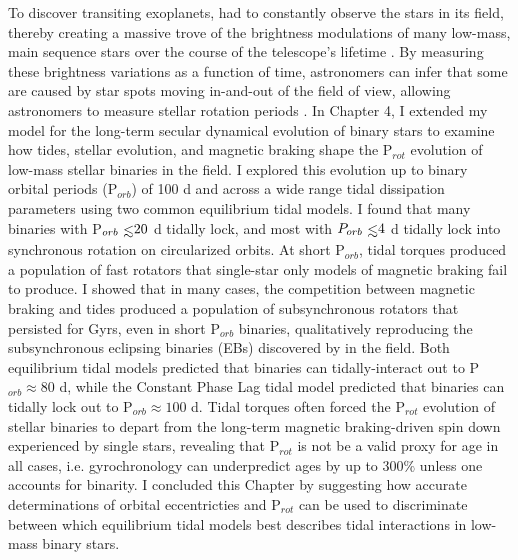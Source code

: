 To discover transiting exoplanets, \kepler had to constantly observe the stars in its field, thereby creating a massive trove of the brightness modulations of many low-mass, main sequence stars over the course of the telescope's lifetime \citep{Borucki2003,Borucki2010}. By measuring these brightness variations as a function of time, astronomers can infer that some are caused by star spots moving in-and-out of the field of view, allowing astronomers to measure stellar rotation periods \citep[P$_{rot}$, see][]{McQuillan2014}. In Chapter 4, I extended my model for the long-term secular dynamical evolution of binary stars to examine how tides, stellar evolution, and magnetic braking shape the P$_{rot}$ evolution of low-mass stellar binaries in the \kepler field. I explored this evolution up to binary orbital periods (P$_{orb}$) of 100 d and across a wide range tidal dissipation parameters using two common equilibrium tidal models. I found that many binaries with P$_{orb} \lsim 20$ d tidally lock, and most with $P_{orb} \lsim 4$ d tidally lock into synchronous rotation on circularized orbits. At short P$_{orb}$, tidal torques produced a population of fast rotators that single-star only models of magnetic braking fail to produce.  I showed that in many cases, the competition between magnetic braking and tides produced a population of subsynchronous rotators that persisted for Gyrs, even in short P$_{orb}$ binaries, qualitatively reproducing the subsynchronous eclipsing binaries (EBs) discovered by \citet{Lurie2017} in the \kepler field. Both equilibrium tidal models predicted that binaries can tidally-interact out to P$_{orb} \approx 80$ d, while the Constant Phase Lag tidal model predicted that binaries can tidally lock out to P$_{orb} \approx 100$ d. Tidal torques often forced the P$_{rot}$ evolution of stellar binaries to depart from the long-term magnetic braking-driven spin down experienced by single stars, revealing that P$_{rot}$ is not be a valid proxy for age in all cases, i.e. gyrochronology can underpredict ages by up to $300\%$ unless one accounts for binarity. I concluded this Chapter by suggesting how accurate determinations of orbital eccentricties and P$_{rot}$ can be used to discriminate between which equilibrium tidal models best describes tidal interactions in low-mass binary stars.
 
